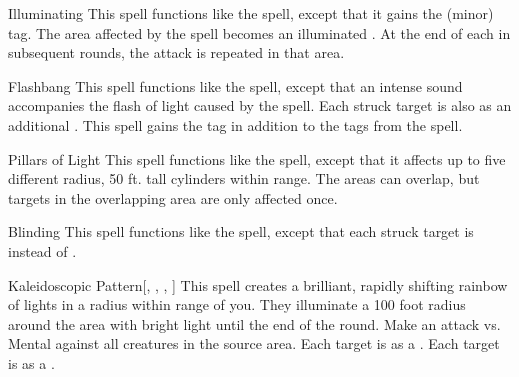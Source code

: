 \lowercase{\hypertarget{spell:Illuminating}{}}\label{spell:Illuminating}
\begin{ability}[\nth{2}]{\hypertarget{spell:Illuminating}{Illuminating}}
This spell functions like the  spell, except that it gains the  (minor) tag.
The area affected by the spell becomes an illuminated .
At the end of each  in subsequent rounds, the attack is repeated in that area.
\end{ability}
\vspace{0.25em}



\lowercase{\hypertarget{spell:Flashbang}{}}\label{spell:Flashbang}
\begin{ability}[\nth{3}]{\hypertarget{spell:Flashbang}{Flashbang}}
This spell functions like the  spell, except that an intense sound accompanies the flash of light caused by the spell.
Each struck target is also  as an additional .
This spell gains the  tag in addition to the tags from the  spell.
\end{ability}
\vspace{0.25em}



\lowercase{\hypertarget{spell:Pillars of Light}{}}\label{spell:Pillars of Light}
\begin{ability}[\nth{3}]{\hypertarget{spell:Pillars of Light}{Pillars of Light}}
This spell functions like the  spell, except that it affects up to five different \areasmall radius, 50 ft. tall cylinders within range.
The areas can overlap, but targets in the overlapping area are only affected once.
\end{ability}
\vspace{0.25em}



\lowercase{\hypertarget{spell:Blinding}{}}\label{spell:Blinding}
\begin{ability}[\nth{4}]{\hypertarget{spell:Blinding}{Blinding}}
This spell functions like the  spell, except that each struck target is  instead of .
\end{ability}
\vspace{0.25em}



\lowercase{\hypertarget{spell:Kaleidoscopic Pattern}{}}\label{spell:Kaleidoscopic Pattern}
\begin{ability}[\nth{4}]{\hypertarget{spell:Kaleidoscopic Pattern}{Kaleidoscopic Pattern}}[, , , ]
This spell creates a brilliant, rapidly shifting rainbow of lights in a \areasmall radius within \rngmed range of you.
They illuminate a 100 foot radius around the area with bright light until the end of the round.
Make an attack vs. Mental against all creatures in the source area.
\hit Each target is \disoriented as a .
\crit Each target is \confused as a .
\end{ability}
\vspace{0.25em}



